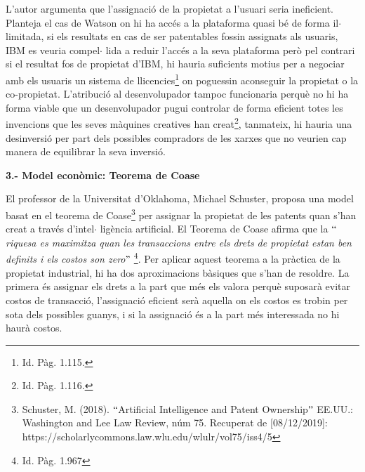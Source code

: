 \documentclass[12pt]{article}
\begin{document}
\vspace{\baselineskip}
\begin{justify}
L’autor argumenta que l’assignació de la propietat a l’usuari seria ineficient. Planteja el cas de Watson on hi ha accés a la plataforma quasi bé de forma il$ \cdot $ limitada, si els resultats en cas de ser patentables fossin assignats als usuaris, IBM es veuria compel$ \cdot $ lida a reduir l’accés a la seva plataforma però pel contrari si el resultat fos de propietat d’IBM, hi hauria suficients motius per a negociar amb els usuaris un sistema de llicencies\footnote{ Id. Pàg. 1.115. } on poguessin aconseguir la propietat o la co-propietat. L’atribució al desenvolupador tampoc funcionaria perquè no hi ha forma viable que un desenvolupador pugui controlar de forma eficient totes les invencions que les seves màquines creatives han creat\footnote{ Id. Pàg. 1.116. }, tanmateix, hi hauria una desinversió per part dels possibles compradors de les xarxes que no veurien cap manera de equilibrar la seva inversió. 
\end{justify}\par


\vspace{\baselineskip}

\vspace{\baselineskip}

\vspace{\baselineskip}
\begin{justify}
\textbf{3.- Model econòmic: Teorema de Coase}
\end{justify}\par


\vspace{\baselineskip}
\begin{justify}
El professor de la Universitat d’Oklahoma, Michael Schuster, proposa una model basat en el teorema de Coase\footnote{ Schuster, M. (2018). $``$Artificial Intelligence and Patent Ownership$"$  EE.UU.: Washington and Lee Law Review, núm 75. Recuperat de [08/12/2019]: https://scholarlycommons.law.wlu.edu/wlulr/vol75/iss4/5 } per assignar la propietat de les patents quan s’han creat a través d’intel$ \cdot $ ligència artificial.  El Teorema de Coase afirma que la $``$\textit{riquesa es maximitza quan les transaccions entre els drets de propietat estan ben definits i els costos son zero}$"$ \footnote{ Id. Pàg. 1.967 }. Per aplicar aquest teorema a la pràctica de la propietat industrial, hi ha dos aproximacions bàsiques que s’han de resoldre. La primera és assignar els drets a la part que més els valora perquè suposarà evitar costos de transacció, l’assignació eficient serà aquella on els costos es trobin per sota dels possibles guanys, i si la assignació és a la part més interessada no hi haurà costos.
\end{justify}\par
\end{document}
